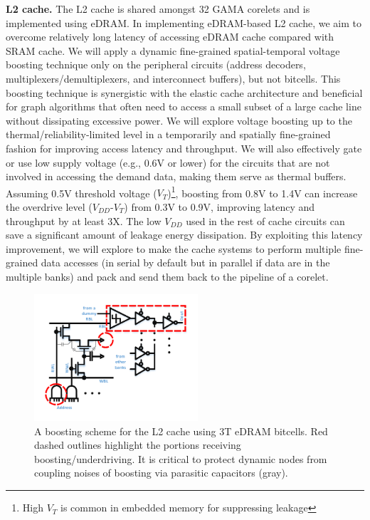 \vspace{3pt}
\noindent
\textbf{L2 cache.}
The L2 cache is shared amongst 32 GAMA corelets and is implemented using eDRAM. In implementing eDRAM-based L2 cache, we aim to %
overcome relatively long latency of accessing eDRAM cache compared with SRAM cache. 
We will apply a dynamic fine-grained spatial-temporal voltage boosting technique only on the peripheral circuits (address decoders, multiplexers/demultiplexers, and interconnect buffers), but not bitcells. 
This boosting technique is synergistic with the elastic cache architecture and beneficial for graph algorithms that often need to access a small subset of a large cache line without dissipating excessive power. 
We will explore voltage boosting up to the thermal/reliability-limited level in a temporarily and spatially fine-grained fashion for improving access latency and throughput. 
We will also effectively gate or use low supply voltage (e.g., 0.6V or lower) for the circuits that are not involved in accessing the demand data, making them serve as thermal buffers. 
Assuming 0.5V threshold voltage ($V_T$)\footnote{High $V_T$ is common in embedded memory for suppressing leakage}, boosting from 0.8V to 1.4V can increase the overdrive level ($V_{DD}$-$V_T$) from 0.3V to 0.9V, improving latency and throughput by at least 3X. 
The low $V_{DD}$ used in the rest of cache circuits can save a significant amount of leakage energy dissipation. 
By exploiting this latency improvement, we will explore to make the cache systems to perform multiple fine-grained data accesses (in serial by default but in parallel if data are in the multiple banks) and pack and send them back to the pipeline of a corelet. 

\begin{figure}
\center
\includegraphics[width=2.4in, trim=20 20 10 50]{./fig/boosting.pdf}
\caption{A boosting scheme for the L2 cache using 3T eDRAM bitcells. Red dashed outlines highlight the portions receiving boosting/underdriving. It is critical to protect dynamic nodes from coupling noises of boosting via parasitic capacitors (gray).}
\label{fig:boosting}
\end{figure}

